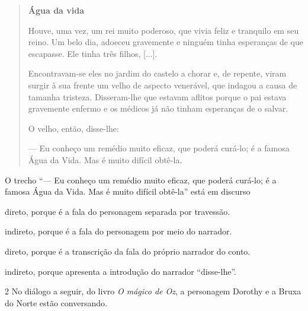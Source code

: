 \begin{quote}
\textbf{Água da vida}

Houve, uma vez, um rei muito poderoso, que vivia feliz e tranquilo em
seu reino. Um belo dia, adoeceu gravemente e ninguém tinha esperanças de
que escapasse. Ele tinha três filhos, {[}...{]}.

Encontravam-se eles no jardim do castelo a chorar e, de repente, viram
surgir à sua frente um velho de aspecto venerável, que indagou a causa
de tamanha tristeza. Disseram-lhe que estavam aflitos porque o pai
estava gravemente enfermo e os médicos já não tinham esperanças de o
salvar.

O velho, então, disse-lhe:

--- Eu conheço um remédio muito eficaz, que poderá curá-lo; é a famosa
Água da Vida. Mas é muito difícil obtê-la.

\end{quote}

O trecho ``--- Eu conheço um remédio muito eficaz, que poderá curá-lo; é a
famosa Água da Vida. Mas é muito difícil obtê-la'' está em discurso

\begin{escolha}
\item direto, porque é a fala do personagem separada por travessão.

\item indireto, porque é a fala do personagem por meio do narrador.

\item direto, porque é a transcrição da fala do próprio narrador do conto.

\item indireto, porque apresenta a introdução do narrador ``disse-lhe''.
\end{escolha}

\num{2} No diálogo a seguir, do livro \textit{O mágico de Oz}, a personagem
Dorothy e a Bruxa do Norte estão conversando.


